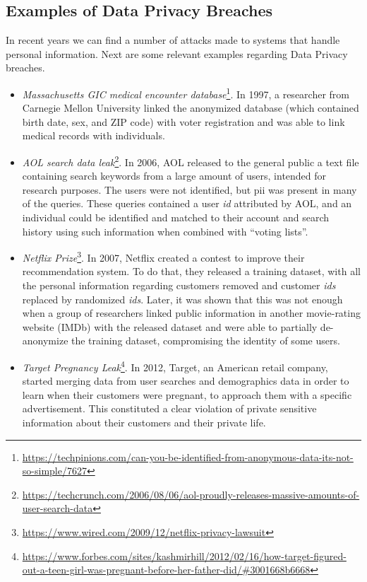 \subsection{Examples of Data Privacy Breaches}
\label{ssec:ExamplesDataPrivacyBreaches}


In recent years we can find a number of attacks made to systems that handle personal information. Next are some relevant examples regarding Data Privacy breaches.

\begin{itemize}
	
	\item \textit{Massachusetts GIC medical encounter database}\footnote{\url{https://techpinions.com/can-you-be-identified-from-anonymous-data-its-not-so-simple/7627}}. In 1997, a researcher from Carnegie Mellon University linked the anonymized database (which contained birth date, sex, and ZIP code) with voter registration and was able to link medical records with individuals.

	\item \textit{AOL search data leak}\footnote{\url{https://techcrunch.com/2006/08/06/aol-proudly-releases-massive-amounts-of-user-search-data}}. In 2006, AOL released to the general public a text file containing search keywords from a large amount of users, intended for research purposes. The users were not identified, but \ac{pii} was present in many of the queries. These queries contained a user \textit{id} attributed by AOL, and an individual could be identified and matched to their account and search history using such information when combined with ``voting lists''.

	\item \textit{Netflix Prize}\footnote{\url{https://www.wired.com/2009/12/netflix-privacy-lawsuit}}. In 2007, Netflix created a contest to improve their recommendation system. To do that, they released a training dataset, with all the personal information regarding customers removed and customer \textit{ids} replaced by randomized \textit{ids}. Later, it was shown that this was not enough when a group of researchers linked public information in another movie-rating website (IMDb) with the released dataset and were able to partially de-anonymize the training dataset, compromising the identity of some users.

	\item \textit{Target Pregnancy Leak}\footnote{\url{https://www.forbes.com/sites/kashmirhill/2012/02/16/how-target-figured-out-a-teen-girl-was-pregnant-before-her-father-did/\#3001668b6668}}. In 2012, Target, an American retail company, started merging data from user searches and demographics data in order to learn when their customers were pregnant, to approach them with a specific advertisement. This constituted a clear violation of private sensitive information about their customers and their private life.


\end{itemize}